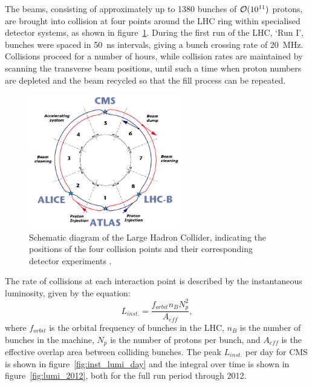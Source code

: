 The beams, consisting of approximately up to 1380 bunches of $\mathcal{O}(10^{11})$
protons, are brought into collision
at four points around the LHC ring within specialised detector systems, as shown
in figure~\ref{fig:lhc_diagram}. During the
first run of the LHC, `Run I', bunches were spaced in 50~ns intervals, giving
a bunch crossing rate of 20~MHz. Collisions proceed for a number of hours, 
while collision rates are maintained by scanning the transverse beam positions, 
until such a time when proton numbers are depleted and the beam recycled so that
the fill process can be repeated.

\begin{figure}[ht!]
\centering
\includegraphics[width=0.6\textwidth]{Figs/machine/lhc-pho-1997-203_english.jpg}
\caption{Schematic diagram of the Large Hadron Collider, indicating the 
positions of the four collision points and their corresponding detector 
experiments \cite{Vittorio:842611}.}
\label{fig:lhc_diagram}
\end{figure}


The rate of collisions at each interaction point is described by the 
instantaneous luminosity, given by the equation:
% 
\begin{equation}
L_{inst.} = \frac{f_{orbit}n_{B}N_p^2}{A_{eff}} ,
\end{equation}
% 
where $f_{orbit}$ is the orbital frequency of bunches in the LHC, $n_B$ is the 
number of bunches in the machine, $N_p$ is the number of protons per bunch, and 
$A_{eff}$ is the effective overlap area between colliding bunches. The peak 
$L_{inst.}$ per day for CMS is shown in figure~\ref{fig:inst_lumi_day} and the
integral over time is shown in figure~\ref{fig:lumi_2012}, both for the full run
period through 2012.


